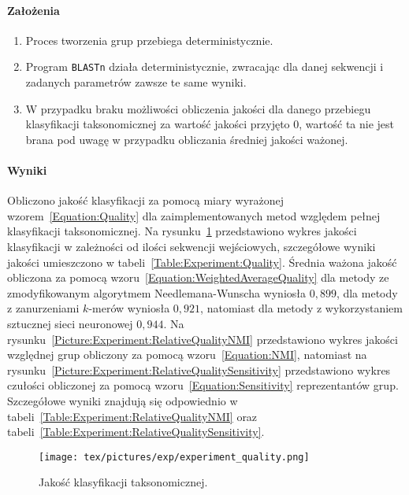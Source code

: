 \documentclass{article}
\begin{document}
{            \paragraph{Założenia}

                \begin{enumerate}
                    \item {
                        Proces tworzenia grup przebiega deterministycznie.
                    }
                    \item {
                        Program \texttt{BLASTn} działa deterministycznie, zwracając dla danej sekwencji i zadanych parametrów zawsze te same wyniki.
                    }
                    \item {
                        W przypadku braku możliwości obliczenia jakości dla danego przebiegu klasyfikacji taksonomicznej za wartość jakości przyjęto $0$, wartość ta nie jest brana pod uwagę w przypadku obliczania średniej jakości ważonej.
                    }
                \end{enumerate}

            \paragraph{Wyniki}
                Obliczono jakość klasyfikacji za pomocą miary wyrażonej wzorem~\ref{Equation:Quality} dla zaimplementowanych metod względem pełnej klasyfikacji taksonomicznej. Na rysunku~\ref{Picture:Experiment:Quality} przedstawiono wykres jakości klasyfikacji w zależności od ilości sekwencji wejściowych, szczegółowe wyniki jakości umieszczono w tabeli~\ref{Table:Experiment:Quality}. Średnia ważona jakość obliczona za pomocą wzoru~\ref{Equation:WeightedAverageQuality} dla metody ze zmodyfikowanym algorytmem Needlemana-Wunscha wyniosła $0,899$, dla metody z zanurzeniami $k$-merów wyniosła $0,921$, natomiast dla metody z wykorzystaniem sztucznej sieci neuronowej $0,944$. Na rysunku~\ref{Picture:Experiment:RelativeQualityNMI} przedstawiono wykres jakości względnej grup obliczony za pomocą wzoru~\ref{Equation:NMI}, natomiast na rysunku~\ref{Picture:Experiment:RelativeQualitySensitivity} przedstawiono wykres czułości obliczonej za pomocą wzoru~\ref{Equation:Sensitivity} reprezentantów grup. Szczegółowe wyniki znajdują się odpowiednio w tabeli~\ref{Table:Experiment:RelativeQualityNMI} oraz tabeli~\ref{Table:Experiment:RelativeQualitySensitivity}.

                \begin{figure}[!htb]
                    \begin{center}
                        \texttt{[image: tex/pictures/exp/experiment\_quality.png]}
                    \end{center}
                    \caption{
                        Jakość klasyfikacji taksonomicznej.
                    }\label{Picture:Experiment:Quality}
                \end{figure}

}
\end{document}
